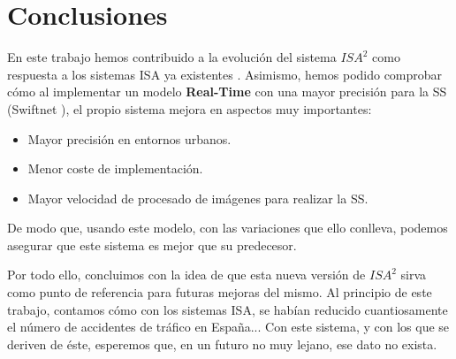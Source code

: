 \chapter{Conclusiones}

En este trabajo hemos contribuido a la evolución del sistema $ISA^{2}$ como respuesta a los sistemas \ac{ISA} ya existentes \cite{isa2}. Asimismo, hemos podido comprobar cómo al implementar un modelo \textbf{Real-Time} con una mayor precisión para la \ac{SS} (Swiftnet \cite{swiftnet}), el propio sistema mejora en aspectos muy importantes:

\begin{itemize}
\item Mayor precisión en entornos urbanos.
\item Menor coste de implementación.
\item Mayor velocidad de procesado de imágenes para realizar la \ac{SS}.
\end{itemize}

De modo que, usando este modelo, con las variaciones que ello conlleva, podemos asegurar que este sistema es mejor que su predecesor.

Por todo ello, concluimos con la idea de que esta nueva versión de $ISA^{2}$ sirva como punto de referencia para futuras mejoras del mismo. Al principio de este trabajo, contamos cómo con los sistemas \ac{ISA}, se habían reducido cuantiosamente el número de accidentes de tráfico en España... Con este sistema, y con los que se deriven de éste, esperemos que, en un futuro no muy lejano, ese dato no exista.